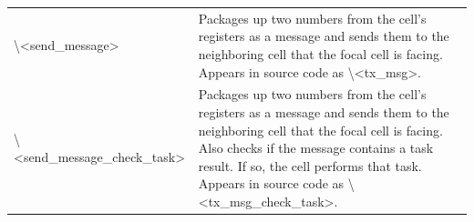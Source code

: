 \documentclass[
]{book}
\begin{document}
\begin{table}
\begin{tabular}[t]{ll}
\addlinespace
\textbackslash{}<send\_message> & Packages up two numbers from the cell's registers as a message and sends them to the neighboring cell that the focal cell is facing. Appears in source code as \textbackslash{}<tx\_msg>.\\
\textbackslash{}<send\_message\_check\_task> & Packages up two numbers from the cell's registers as a message and sends them to the neighboring cell that the focal cell is facing. Also checks if the message contains a task result. If so, the cell performs that task. Appears in source code as \textbackslash{}<tx\_msg\_check\_task>.\\
\bottomrule
\end{tabular}
\end{table}

\begin{table}


\end{table}
\end{document}
